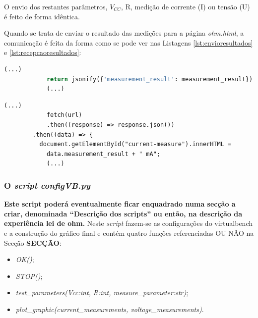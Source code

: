 O envio dos restantes parâmetros, $V_{CC}$, R, medição de corrente (I) ou tensão (U) é feito de forma idêntica.

Quando se trata de enviar o resultado das medições para a página \textit{ohm.html}, a comunicação é feita da forma como se pode ver nas Listagens \ref{lst:envioresultados} e \ref{lst:recepcaoresultados}:
\begin{center}
	\begin{minipage}{0.7\linewidth}
		\begin{lstlisting}[language=python, caption=Envio de resultados do servidor (\textit{views.py}) para a página \textit{ohm.html}, label=lst:envioresultados]
			(...)
			return jsonify({'measurement_result': measurement_result})
			(...)
	\end{lstlisting}
	\end{minipage}
\end{center}

\begin{center}
	\begin{minipage}{0.7\linewidth}
		\begin{lstlisting}[language=html, caption=Recepção de resultados na página \textit{ohm.html}, label=lst:recepcaoresultados]
			(...)
			fetch(url)
			.then((response) => response.json())
		.then((data) => {
		  document.getElementById("current-measure").innerHTML =
			data.measurement_result + " mA";
			(...)
			\end{lstlisting}
	\end{minipage}
\end{center}

\subsubsection{O \textit{script configVB.py}}
\textbf{Este script poderá eventualmente ficar enquadrado numa secção a criar, denominada ``Descrição dos scripts'' ou então, na descrição da experiência lei de ohm.}
Neste \textit{script} fazem-se as configurações do \acrshort{virtualbench} e a construção do gráfico final e contém quatro funções referenciadas OU NÃO na Secção \textbf{SECÇÃO}:
\begin{itemize}
	\item \textit{OK()};
	\item \textit{STOP()};
	\item \textit{test\_parameters(Vcc:int, R:int, measure\_parameter:str)};
	\item \textit{plot\_graphic(current\_measurements, voltage\_measurements)}.
\end{itemize}

